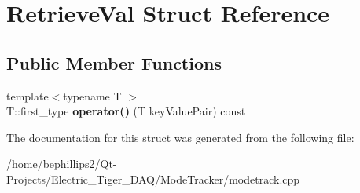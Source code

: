 \hypertarget{struct_retrieve_val}{}\section{Retrieve\+Val Struct Reference}
\label{struct_retrieve_val}
\subsection*{Public Member Functions}
\begin{DoxyCompactItemize}
\item 
{\footnotesize template$<$typename T $>$ }\\T\+::first\+\_\+type {\bfseries operator()} (T key\+Value\+Pair) const \hypertarget{struct_retrieve_val_a497045c23da008812919a69049998b1e}{}\label{struct_retrieve_val_a497045c23da008812919a69049998b1e}

\end{DoxyCompactItemize}


The documentation for this struct was generated from the following file\+:\begin{DoxyCompactItemize}
\item 
/home/bephillips2/\+Qt-\/\+Projects/\+Electric\+\_\+\+Tiger\+\_\+\+D\+A\+Q/\+Mode\+Tracker/modetrack.\+cpp\end{DoxyCompactItemize}
